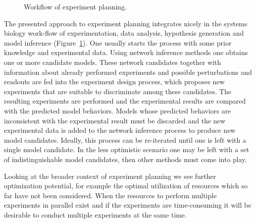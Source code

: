 \begin{figure}[]
\begin{center}

\caption{
Workflow of experiment planning.
}
\label{fig:planning_loop}
\end{center}
\end{figure}

The presented approach to experiment planning integrates nicely in the systems
biology work-flow of experimentation, data analysis, hypothesis generation and
model inference (Figure~\ref{fig:planning_loop}).
One usually starts the process with some prior knowledge and experimental data.
Using network inference methods one obtains one or more candidate models.
These network candidates together with information about already performed
 experiments and possible perturbations and readouts are fed into the
 experiment design process, which proposes new experiments that are suitable to
 discriminate among these candidates.
The resulting experiments are performed and the experimental results are
compared with the predicted model behaviors.
Models whose predicted behaviors are inconsistent with the experimental result
must be discarded and the new experimental data is added to the network
inference process to produce new model candidates.
Ideally, this process can be re-iterated until one is left with a single model
candidate.
In the less optimistic scenario one may be left with a set of indistinguishable
model candidates, then other methods must come into play.

Looking at the broader context of experiment planning we see further
optimization potential,
for example the optimal utilization of resources which so far have not been considered.
When the resources to perform multiple experiments in parallel exist and if the
experiments are time-consuming it will be desirable to conduct multiple experiments
at the same time.



